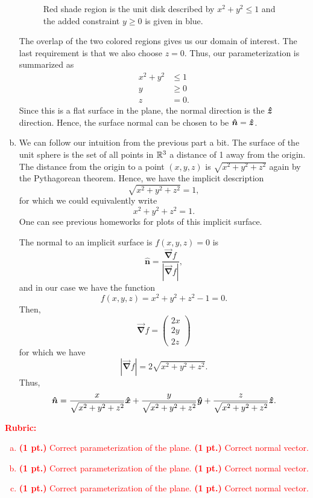 \documentclass[12pt]{article} %
\newcommand{\grad}{\boldsymbol{\vec{\nabla}}}
\newcommand{\unitvec}{\boldsymbol{\hat{n}}}
\begin{document}
\begin{solution}
\begin{enumerate}[(a)]
\begin{figure}[H]
        \caption{Red shade region is the unit disk described by $x^2+y^2\leq 1$ and the added constraint $y\geq 0$ is given in blue.}
    \end{figure}
    The overlap of the two colored regions gives us our domain of interest. The last requirement is that we also choose $z=0$. Thus, our parameterization is summarized as
    \begin{align*}
    x^2+y^2 &\leq 1 \\
    y &\geq 0\\
    z &= 0.
    \end{align*}
    Since this is a flat surface in the plane, the normal direction is the $\boldsymbol{\hat{z}}$ direction. Hence, the surface normal can be chosen to be $\unitvec = \zhat$.
    
    \item We can follow our intuition from the previous part a bit. The surface of the unit sphere is the set of all points in $\mathbb{R}^3$ a distance of 1 away from the origin. The distance from the origin to a point $(x,y,z)$ is $\sqrt{x^2+y^2+z^2}$ again by the Pythagorean theorem. Hence, we have the implicit description
    \[
    \sqrt{x^2+y^2+z^2}=1,
    \]
    for which we could equivalently write
    \[
    x^2+y^2+z^2 =1.
    \]
    One can see previous homeworks for plots of this implicit surface.

    The normal to an implicit surface is $f(x,y,z)=0$ is
    \[
    \unitvec = \frac{\grad f}{|\grad f|},
    \]
    and in our case we have the function
    \[
    f(x,y,z) = x^2+y^2+z^2 -1 = 0.
    \]
    Then, 
    \[
    \grad f = \begin{pmatrix} 2x \\ 2y \\ 2z \end{pmatrix}
    \]
    for which we have
    \[
    |\grad f| = 2\sqrt{x^2+y^2+z^2}.
    \]
    Thus,
    \[
    \unitvec= \frac{x}{\sqrt{x^2+y^2+z^2}} \xhat  + \frac{y}{\sqrt{x^2+y^2+z^2}} \yhat  + \frac{z}{\sqrt{x^2+y^2+z^2}} \zhat.
    \]
\end{enumerate}
\end{solution}
\vspace*{1cm}
\textcolor{red}{
\noindent \textbf{Rubric:}
\begin{enumerate}[(a)]
    \item \textbf{(1 pt.)} Correct parameterization of the plane. \textbf{(1 pt.)} Correct normal vector.
    \item \textbf{(1 pt.)} Correct parameterization of the plane. \textbf{(1 pt.)} Correct normal vector.
    \item \textbf{(1 pt.)} Correct parameterization of the plane. \textbf{(1 pt.)} Correct normal vector.
\end{enumerate}
}
\end{document}
